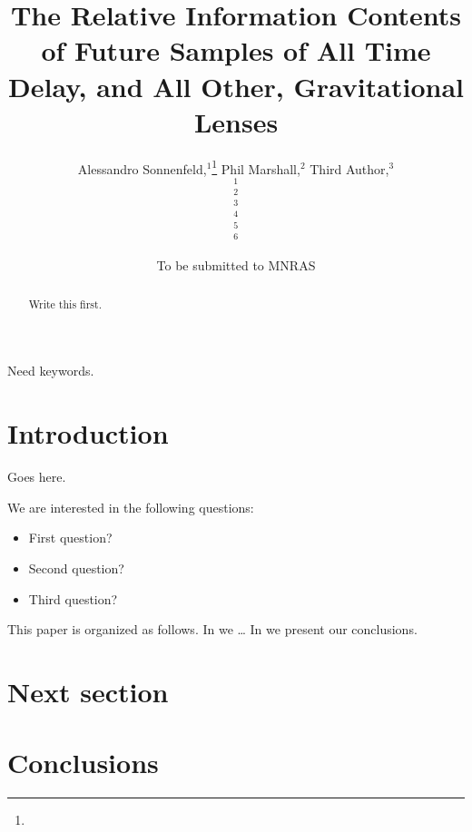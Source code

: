 \documentclass[useAMS,usenatbib]{mn2e}
\title[All The Lenses]
{The Relative Information Contents of 
Future Samples of All Time Delay, and All Other, Gravitational Lenses}
\author[All of us]{%
  Alessandro Sonnenfeld,$^{1}$\thanks{\email}
  Phil Marshall,$^{2}$
  Third Author,$^{3}$
\newauthor{%
  Fourth Author,$^{4}$
  Fifth Author,$^{5}$
  Sixth Author.$^{6}$}
  \medskip\\
  $^1$\ucsb\\
  $^2$\kipac\\
  $^3$\thirdplace\\
  $^4$\fourthplace\\
  $^5$\fifthplace\\
  $^6$\sixthplace\\
}
\begin{document}
             
\date{To be submitted to MNRAS}
             
\pagerange{\pageref{firstpage}--\pageref{lastpage}}

\maketitle

\label{firstpage}


\begin{abstract}
Write this first.
\end{abstract}

\begin{keywords}
  Need keywords.
\end{keywords}


\section{Introduction}

Goes here.

We are interested in the following questions:

\begin{itemize}

\item First question?

\item Second question? 

\item Third question? 

\end{itemize}

This paper is organized as follows. In  we \ldots
In  we present our conclusions.



\section{Next section}
\label{sec:next}



\section{Conclusions}
\label{sec:conclude}
\end{document}

